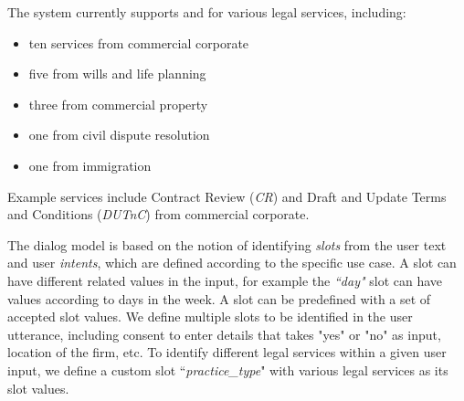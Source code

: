\documentclass[runningheads]{llncs}
\let\svthefootnote\thefootnote
\newcommand\colorfootnote[2][black]{\def\thefootnote{\color{#1}\svthefootnote}%
  \footnote{\color{#1}#2}\def\thefootnote{\color{black}\svthefootnote}}
\newcommand{\MUDITA}[1]{\protect\colorfootnote[blue]{{\textbf{[MUDITA: #1]}}}}
\begin{document}
%
The system currently supports \faq and \ff for various legal services, including:
\begin{itemize}
  \item ten services from commercial corporate
  \item five from wills and life planning
  \item three from commercial property
  \item one from civil dispute resolution
  \item one from immigration
\end{itemize}
Example services include Contract Review (\textit{CR}) and Draft and Update Terms and Conditions (\textit{DUTnC}) from commercial corporate. %

The dialog model is based on the notion of identifying \emph{slots} from the user text and user \emph{intents}, which are defined according to the specific use case.
A slot can have different related values in the input, for example the \textit{``day"} slot can have values according to days in the week. A slot can be predefined with a set of accepted slot values. 
We define multiple slots to be identified in the user utterance, including consent to enter details that takes "yes" or "no" as input, location of the firm, etc. 
To identify different legal services within a given user input, we define a custom slot ``\textit{practice\_type}" with various legal services as its slot values. 
\end{document}
